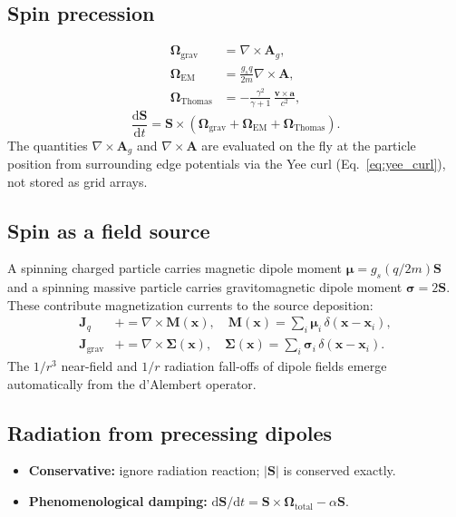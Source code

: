 \documentclass[11pt,a4paper]{article}
\newcommand{\vv}[1]{\mathbf{#1}}
\newcommand{\Ag}{\vv{A}_g}
\newcommand{\dd}{\mathrm{d}}
\begin{document}
\subsection{Spin precession}

\begin{align}
  \boldsymbol{\Omega}_{\mathrm{grav}}   &= \nabla\times\Ag, \\
  \boldsymbol{\Omega}_{\mathrm{EM}}     &= \frac{g_s q}{2m}\nabla\times\vv{A}, \\
  \boldsymbol{\Omega}_{\mathrm{Thomas}} &= -\frac{\gamma^2}{\gamma+1}\,\frac{\vv{v}\times\vv{a}}{c^2},
\end{align}
\begin{equation}
  \frac{\dd\vv{S}}{\dd t} = \vv{S}\times\!\left(\boldsymbol{\Omega}_{\mathrm{grav}} + \boldsymbol{\Omega}_{\mathrm{EM}} + \boldsymbol{\Omega}_{\mathrm{Thomas}}\right).
\end{equation}
The quantities $\nabla\times\Ag$ and $\nabla\times\vv{A}$ are evaluated on the fly at the particle position from surrounding edge potentials via the Yee curl (Eq.~\ref{eq:yee_curl}), not stored as grid arrays.

\subsection{Spin as a field source}

A spinning charged particle carries magnetic dipole moment $\boldsymbol{\mu} = g_s(q/2m)\vv{S}$ and a spinning massive particle carries gravitomagnetic dipole moment $\boldsymbol{\sigma} = 2\vv{S}$.  These contribute magnetization currents to the source deposition:
\begin{align}
  \vv{J}_q    &\mathrel{+}= \nabla\times\vv{M}(\vv{x}), \quad \vv{M}(\vv{x}) = \sum_i \boldsymbol{\mu}_i\,\delta(\vv{x}-\vv{x}_i), \\
  \vv{J}_{\mathrm{grav}} &\mathrel{+}= \nabla\times\boldsymbol{\Sigma}(\vv{x}), \quad \boldsymbol{\Sigma}(\vv{x}) = \sum_i \boldsymbol{\sigma}_i\,\delta(\vv{x}-\vv{x}_i).
\end{align}
The $1/r^3$ near-field and $1/r$ radiation fall-offs of dipole fields emerge automatically from the d'Alembert operator.

\subsection{Radiation from precessing dipoles}

\begin{itemize}
  \item \textbf{Conservative:} ignore radiation reaction; $|\vv{S}|$ is conserved exactly.
  \item \textbf{Phenomenological damping:} $\dd\vv{S}/\dd t = \vv{S}\times\boldsymbol{\Omega}_{\mathrm{total}} - \alpha\vv{S}$.
\end{itemize}
\end{document}
